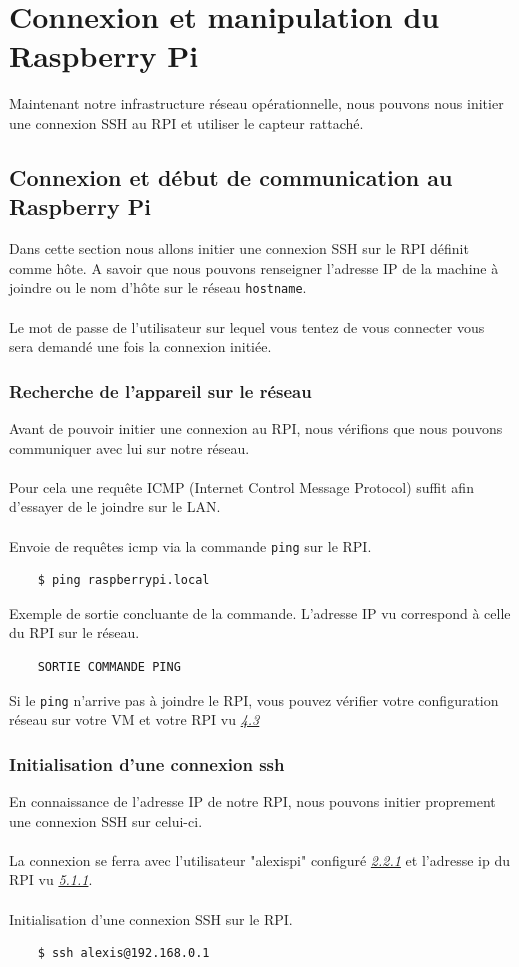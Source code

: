 \documentclass[a4paper]{article}
\begin{document}
\section{Connexion et manipulation du Raspberry Pi}
Maintenant notre infrastructure réseau opérationnelle, nous pouvons nous initier une connexion SSH au RPI et utiliser le capteur rattaché.
\subsection{Connexion et début de communication au Raspberry Pi}
Dans cette section nous allons initier une connexion SSH sur le RPI définit comme hôte. A savoir que nous pouvons renseigner l'adresse IP de la machine à joindre ou le nom d'hôte sur le réseau \verb|hostname|.\\\\Le mot de passe de l'utilisateur sur lequel vous tentez de vous connecter vous sera demandé une fois la connexion initiée.
\subsubsection{Recherche de l'appareil sur le réseau}
\label{sec:iprpi}
Avant de pouvoir initier une connexion au RPI, nous vérifions que nous pouvons communiquer avec lui sur notre réseau.\\\\Pour cela une requête ICMP (Internet Control Message Protocol) suffit afin d'essayer de le joindre sur le LAN.\\\\Envoie de requêtes icmp via la commande \verb|ping| sur le RPI.
\begin{lstlisting}
    $ ping raspberrypi.local
\end{lstlisting}
Exemple de sortie concluante de la commande. L'adresse IP vu correspond à celle du RPI sur le réseau.
\begin{lstlisting}
    SORTIE COMMANDE PING
\end{lstlisting}
Si le \verb|ping| n'arrive pas à joindre le RPI, vous pouvez vérifier votre configuration réseau sur votre VM et votre RPI vu \hyperref[sec:ici]{\textit{4.3}}
\subsubsection{Initialisation d'une connexion ssh}
En connaissance de l'adresse IP de notre RPI, nous pouvons initier proprement une connexion SSH sur celui-ci.\\\\La connexion se ferra avec l'utilisateur "alexispi" configuré \hyperref[sec:sec03]{\textit{2.2.1}} et l'adresse ip du RPI vu \hyperref[sec:iprpi]{\textit{5.1.1}}.\\\\Initialisation d'une connexion SSH sur le RPI.
\begin{lstlisting}
    $ ssh alexis@192.168.0.1
\end{lstlisting}
\end{document}
